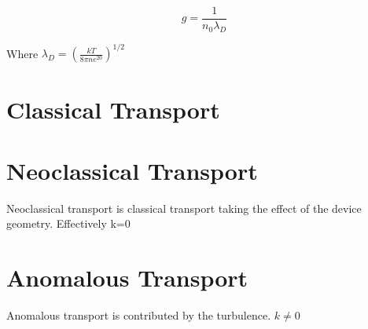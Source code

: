 \begin{equation}
    g=\frac{1}{n_0\lambda_D}
\end{equation}

Where $\lambda_D=(\frac{kT}{8\pi n e^20})^{1/2}$

\section{Classical Transport}

\section{Neoclassical Transport}

Neoclassical transport is classical transport taking the effect of the device geometry. Effectively k=0 

\section{Anomalous Transport}

Anomalous transport is contributed by the turbulence. $k\neq 0$ 
